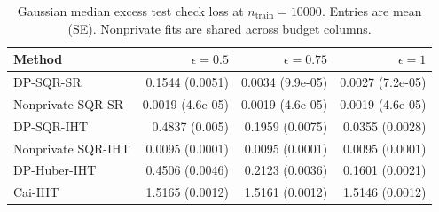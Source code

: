 \begin{table}[!htb]
\centering\small\journaltablestyle
\caption{Gaussian median excess test check loss at $n_{\mathrm{train}}=10000$. Entries are mean (SE). Nonprivate fits are shared across budget columns.}
\label{tab:sim-high-pe}
\begin{tabular}{@{}lrrr@{}}
\toprule
Method & $\epsilon=0.5$ & $\epsilon=0.75$ & $\epsilon=1$\\
\midrule
DP-SQR-SR & 0.1544 (0.0051) & 0.0034 (9.9e-05) & 0.0027 (7.2e-05)\\
Nonprivate SQR-SR & 0.0019 (4.6e-05) & 0.0019 (4.6e-05) & 0.0019 (4.6e-05)\\
DP-SQR-IHT & 0.4837 (0.005) & 0.1959 (0.0075) & 0.0355 (0.0028)\\
Nonprivate SQR-IHT & 0.0095 (0.0001) & 0.0095 (0.0001) & 0.0095 (0.0001)\\
DP-Huber-IHT & 0.4506 (0.0046) & 0.2123 (0.0036) & 0.1601 (0.0021)\\
Cai-IHT & 1.5165 (0.0012) & 1.5161 (0.0012) & 1.5146 (0.0012)\\
\bottomrule
\end{tabular}
\end{table}
